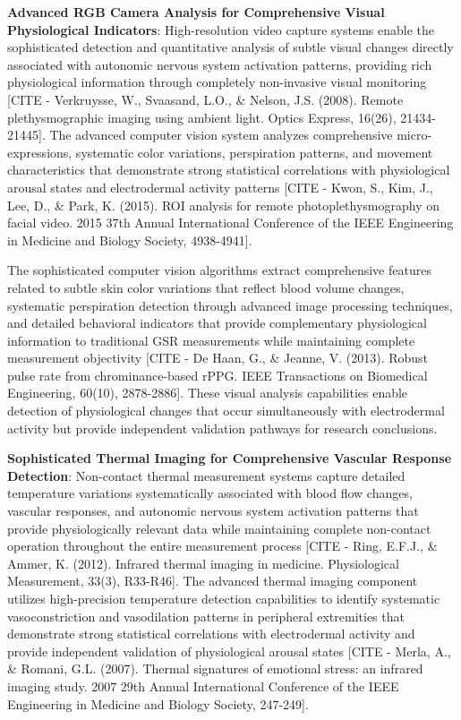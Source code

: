 \documentclass[11pt,a4paper]{report}
\begin{document}
\textbf{Advanced RGB Camera Analysis for Comprehensive Visual Physiological Indicators}: High-resolution video capture
systems enable the sophisticated detection and quantitative analysis of subtle visual changes directly associated with
autonomic nervous system activation patterns, providing rich physiological information through completely non-invasive
visual
monitoring [CITE - Verkruysse, W., Svaasand, L.O., \& Nelson, J.S. (2008). Remote plethysmographic imaging using ambient light. Optics Express, 16(26), 21434-21445].
The advanced computer vision system analyzes comprehensive micro-expressions, systematic color variations, perspiration
patterns, and movement characteristics that demonstrate strong statistical correlations with physiological arousal
states and electrodermal activity
patterns [CITE - Kwon, S., Kim, J., Lee, D., \& Park, K. (2015). ROI analysis for remote photoplethysmography on facial video. 2015 37th Annual International Conference of the IEEE Engineering in Medicine and Biology Society, 4938-4941].

The sophisticated computer vision algorithms extract comprehensive features related to subtle skin color variations that
reflect blood volume changes, systematic perspiration detection through advanced image processing techniques, and
detailed behavioral indicators that provide complementary physiological information to traditional GSR measurements
while maintaining complete measurement
objectivity [CITE - De Haan, G., \& Jeanne, V. (2013). Robust pulse rate from chrominance-based rPPG. IEEE Transactions on Biomedical Engineering, 60(10), 2878-2886].
These visual analysis capabilities enable detection of physiological changes that occur simultaneously with
electrodermal activity but provide independent validation pathways for research conclusions.

\textbf{Sophisticated Thermal Imaging for Comprehensive Vascular Response Detection}: Non-contact thermal measurement systems
capture detailed temperature variations systematically associated with blood flow changes, vascular responses, and
autonomic nervous system activation patterns that provide physiologically relevant data while maintaining complete
non-contact operation throughout the entire measurement
process [CITE - Ring, E.F.J., \& Ammer, K. (2012). Infrared thermal imaging in medicine. Physiological Measurement, 33(3), R33-R46].
The advanced thermal imaging component utilizes high-precision temperature detection capabilities to identify systematic
vasoconstriction and vasodilation patterns in peripheral extremities that demonstrate strong statistical correlations
with electrodermal activity and provide independent validation of physiological arousal
states [CITE - Merla, A., \& Romani, G.L. (2007). Thermal signatures of emotional stress: an infrared imaging study. 2007 29th Annual International Conference of the IEEE Engineering in Medicine and Biology Society, 247-249].
\end{document}
